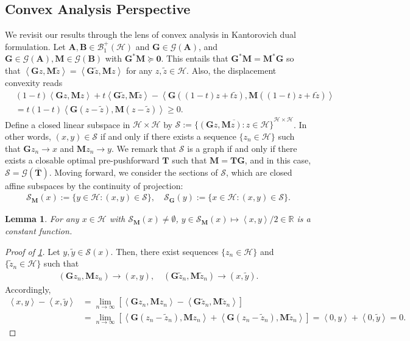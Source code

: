 \documentclass[noinfoline]{imsart}\setcounter{tocdepth}{2}
\renewcommand{\b}[1]{\mathbb{#1}} %
\newcommand{\m}[1]{\mathbf{#1}} %
\renewcommand{\c}[1]{\mathcal{#1}} %
\newcommand{\innpr}[2]{{\left\langle {#1},{#2}\right\rangle}} %
\theoremstyle{plain}
\newtheorem{lemma}[theorem]{Lemma}
\begin{document}
\subsection{Convex Analysis Perspective}
We revisit our results through the lens of convex analysis in
Kantorovich dual formulation. Let $\m{A}, \m{B} \in \c{B}_{1}^{+}(\c{H})$ and $\m{G} \in \c{G}(\m{A})$, and $\m{G} \in \c{G}(\m{A}), \m{M} \in \c{G}(\m{B})$ with $\m{G}^{*} \m{M} \succeq \m{0}$. This entails that $\m{G}^{*} \m{M} = \m{M}^{*} \m{G}$ so that $\innpr{\m{G} z}{\m{M} \tilde{z}} = \innpr{\m{G} \tilde{z}}{\m{M} z}$ for any $z, \tilde{z} \in \c{H}$. Also, the displacement convexity reads
\begin{align}\label{eq:disp:cvx}
    &(1-t) \innpr{\m{G} z}{\m{M} z} + t \innpr{\m{G} \tilde{z}}{\m{M} \tilde{z}} - \innpr{\m{G} ((1-t) z + t \tilde{z})}{\m{M} ((1-t) z + t \tilde{z})} \nonumber \\
    &= t(1-t) \innpr{\m{G} (z-\tilde{z})}{\m{M} (z-\tilde{z})} \ge 0.
\end{align}
Define a closed linear subspace in $\c{H} \times \c{H}$ by $\c{S} := \overline{\{(\m{G} z, \m{M} z) : z \in \c{H} \}}^{\c{H} \times \c{H}}$.
In other words, $(x, y) \in \c{S}$ if and only if there exists a sequence $\{z_{n} \in \c{H}\}$ such that $\m{G} z_{n} \to x$ and $\m{M} z_{n} \to y$. We remark that $\c{S}$ is a graph if and only if there exists a closable optimal pre-pushforward $\m{T}$ such that $\m{M} = \m{T} \m{G}$, and in this case, $\c{S} = \c{G}(\overline{\m{T}})$. Moving forward, we consider the sections of $\c{S}$, which are closed affine subspaces by the continuity of projection:
\begin{align*}
    \c{S}_{\m{M}}(x) := \{y \in \c{H} : (x, y) \in \c{S}\}, \quad \c{S}_{\m{G}}(y) := \{x \in \c{H} : (x, y) \in \c{S}\}.
\end{align*}

\begin{lemma}\label{lem:innpr:const}
For any $x \in \c{H}$ with $\c{S}_{\m{M}}(x) \ne \emptyset$, $y \in \c{S}_{\m{M}}(x) \mapsto \innpr{x}{y}/2 \in \b{R}$
is a constant function.
\end{lemma}
\begin{proof}[Proof of \cref{lem:innpr:const}]
Let $y, \tilde{y} \in \c{S}(x)$. Then, there exist sequences $\{z_{n} \in \c{H}\}$ and $\{\tilde{z}_{n} \in \c{H}\}$ such that 
\begin{align*}
    (\m{G} z_{n}, \m{M} z_{n}) \to (x, y), \quad (\m{G} \tilde{z}_{n}, \m{M} \tilde{z}_{n}) \to (x, \tilde{y}).
\end{align*}
Accordingly,
\begin{align*}
    \innpr{x}{y} - \innpr{x}{\tilde{y}} &= \lim_{n \to \infty} [\innpr{\m{G} z_{n}}{\m{M} z_{n}} - \innpr{\m{G} \tilde{z}_{n}}{\m{M} \tilde{z}_{n}}]
    \\
    &= \lim_{n \to \infty} [\innpr{\m{G} (z_{n} - \tilde{z}_{n})}{\m{M} z_{n}} + \innpr{\m{G} (z_{n} - \tilde{z}_{n})}{\m{M} \tilde{z}_{n}}] = \innpr{0}{y} + \innpr{0}{\tilde{y}} = 0.
\end{align*}
\end{proof}
\end{document}
